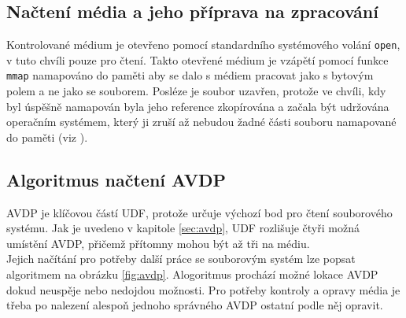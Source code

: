 \subsection{Načtení média a jeho příprava na zpracování}
Kontrolované médium je otevřeno pomocí standardního systémového volání \texttt{open}, v tuto chvíli pouze pro čtení. Takto otevřené médium je vzápětí pomocí funkce \texttt{mmap} namapováno do paměti aby se dalo s médiem pracovat jako s bytovým polem a ne jako se souborem. Posléze je soubor uzavřen, protože ve chvíli, kdy byl úspěšně namapován byla jeho reference zkopírována a začala být udržována operačním systémem, který ji zruší až nebudou žadné části souboru namapované do paměti (viz \cite{posix-mmap}). 

\subsection{Algoritmus načtení AVDP}
AVDP je klíčovou částí UDF, protože určuje výchozí bod pro čtení souborového systému. Jak je uvedeno v kapitole \ref{sec:avdp}, UDF rozlišuje čtyři možná umístění AVDP, přičemž přítomny mohou být až tři na médiu.\\
Jejich načítání pro potřeby další práce se souborovým systém lze popsat algoritmem na obrázku \ref{fig:avdp}. Alogoritmus prochází možné lokace AVDP dokud neuspěje nebo nedojdou možnosti. Pro potřeby kontroly a opravy média je třeba po nalezení alespoň jednoho správného AVDP ostatní podle něj opravit.
